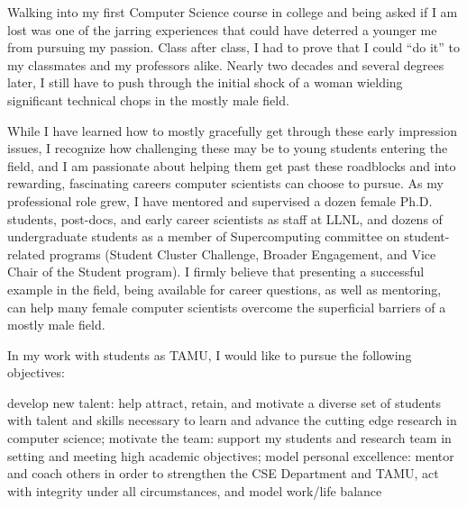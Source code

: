 \documentclass[12pt]{article}
\begin{document}
Walking into my first Computer Science course in college and being asked if I am lost was one of the jarring experiences that could have deterred a younger me from pursuing my passion.  Class after class, I had to prove that I could ``do it''
to my classmates and my professors alike.  Nearly two decades and several degrees later, I still have to push through the initial shock of a woman wielding significant technical chops in the mostly male field.

While I have learned how to mostly gracefully get through these early impression issues, I recognize how challenging these may be to young students entering the field, and I am passionate about helping them get past these roadblocks and into rewarding, fascinating careers computer scientists can choose to pursue.  As my professional role grew, I have mentored and supervised a dozen female Ph.D. students, post-docs, and early career scientists as staff at LLNL, and dozens of undergraduate students as a member of Supercomputing committee on student-related programs (Student Cluster Challenge, Broader Engagement, and Vice Chair of the Student program).  I firmly believe that presenting a successful example in the field, being available for career questions, as well as mentoring, can help many female computer scientists overcome the superficial barriers of a mostly male field.

In my work with students as TAMU, I would like to pursue the following objectives:

develop new talent: help attract, retain, and motivate a diverse set of students with talent and skills necessary to learn and advance the cutting edge research in computer science;
motivate the team: support my students and research team in setting and meeting high academic objectives;
model personal excellence: mentor and coach others in order to strengthen the CSE Department and TAMU, act with integrity under all circumstances, and model work/life balance~
\end{document}
